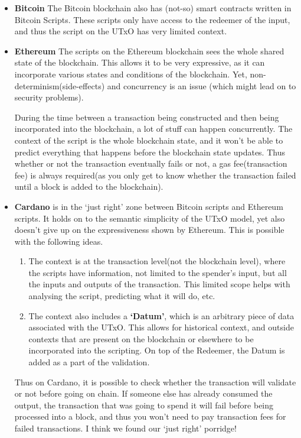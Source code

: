 \documentclass[a4paper, 11pt]{article}
\begin{document}
    \begin{itemize}
        \item \textbf{Bitcoin} The Bitcoin blockchain also has (not-so) smart contracts written in Bitcoin Scripts. These scripts only have access to the redeemer of the input, and thus the script on the UTxO has very limited context.
         
        \item \textbf{Ethereum} The scripts on the Ethereum blockchain sees the whole shared state of the blockchain. This allows it to be very expressive, as it can incorporate various states and conditions of the blockchain. Yet, non-determinism(side-effects) and concurrency is an issue (which might lead on to security problems).
        
        During the time between a transaction being constructed and then being incorporated into the blockchain, a lot of stuff can happen concurrently. The context of the script is the whole blockchain state, and it won't be able to predict everything that happens before the blockchain state updates. Thus whether or not the transaction eventually fails or not, a gas fee(transaction fee) is always required(as you only get to know whether the transaction failed until a block is added to the blockchain). 

        \item \textbf{Cardano} is in the `just right' zone between Bitcoin scripts and Ethereum scripts. It holds on to the semantic simplicity of the UTxO model, yet also doesn't give up on the expressiveness shown by Ethereum. This is possible with the following ideas. 
        \begin{enumerate}
            \item The context is at the transaction level(not the blockchain level), where the scripts have information, not limited to the spender's input, but all the inputs and outputs of the transaction. This limited scope helps with analysing the script, predicting what it will do, etc.
            \item The context also includes a \textbf{`Datum'}, which is an arbitrary piece of data associated with the UTxO. This allows for historical context, and outside contexts that are present on the blockchain or elsewhere to be incorporated into the scripting. On top of the Redeemer, the Datum is added as a part of the validation.
        \end{enumerate} 

        Thus on Cardano, it is possible to check whether the transaction will validate or not before going on chain. If someone else has already consumed the output, the transaction that was going to spend it will fail before being processed into a block, and thus you won't need to pay transaction fees for failed transactions. I think we found our `just right' porridge!
    \end{itemize}
\end{document}
